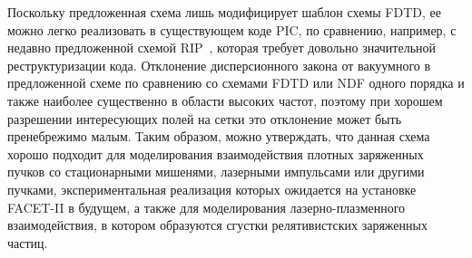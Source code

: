 

Поскольку предложенная схема лишь модифицирует шаблон схемы FDTD, ее можно легко реализовать в существующем коде PIC, по сравнению, например, с недавно предложенной схемой RIP~\cite{Pukhov2019}, которая требует довольно значительной реструктуризации кода.
Отклонение дисперсионного закона от вакуумного в предложенной схеме по сравнению со схемами FDTD или NDF одного порядка и также наиболее существенно в области высоких частот, поэтому при хорошем разрешении интересующих полей на сетки это отклонение может быть пренебрежимо малым.
Таким образом, можно утверждать, что данная схема хорошо подходит для моделирования взаимодействия плотных заряженных пучков со стационарными мишенями, лазерными импульсами или другими пучками, экспериментальная реализация которых ожидается на установке FACET-II в будущем, а также для моделирования лазерно-плазменного взаимодействия, в котором образуются сгустки релятивистских заряженных частиц.

